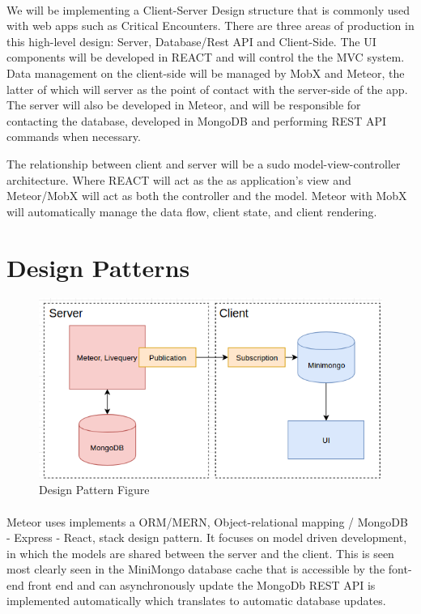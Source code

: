 \documentclass[12pt,a4paper]{report}
\begin{document}
		\paragraph{}We will be implementing a Client-Server Design structure that is commonly used with web apps such as Critical Encounters. There are three areas of production in this high-level design: Server, Database/Rest API and Client-Side. The UI components will be developed in REACT and will control the the MVC system. Data management on the client-side will be managed by MobX and Meteor, the latter of which will server as the point of contact with the server-side of the app. The server will also be developed in Meteor, and will be responsible for contacting the database, developed in MongoDB and performing REST API commands when necessary. \par
		 The relationship between client and server will be a sudo model-view-controller architecture. Where REACT will act as the as application's view and Meteor/MobX will act as both the controller and the model. Meteor with MobX will automatically manage the data flow, client state, and client rendering. \cite{medium}
	
	\section {Design Patterns}
		
		\begin{figure}[H]
			\centering
			\includegraphics[scale=.7]{orm.png}
			\caption{Design Pattern Figure}
			\label{fig: Design Pattern Figure}
		\end{figure}
		
		\paragraph{} Meteor uses implements a ORM/MERN, Object-relational mapping / MongoDB - Express - React, stack design pattern. It focuses on model driven development, in which the models are shared between the server and the client. This is seen most clearly seen in the MiniMongo database cache that is accessible by the font-end front end and can asynchronously update the MongoDb REST API is implemented automatically which translates to automatic database updates. \cite{meanmern}
\end{document}
